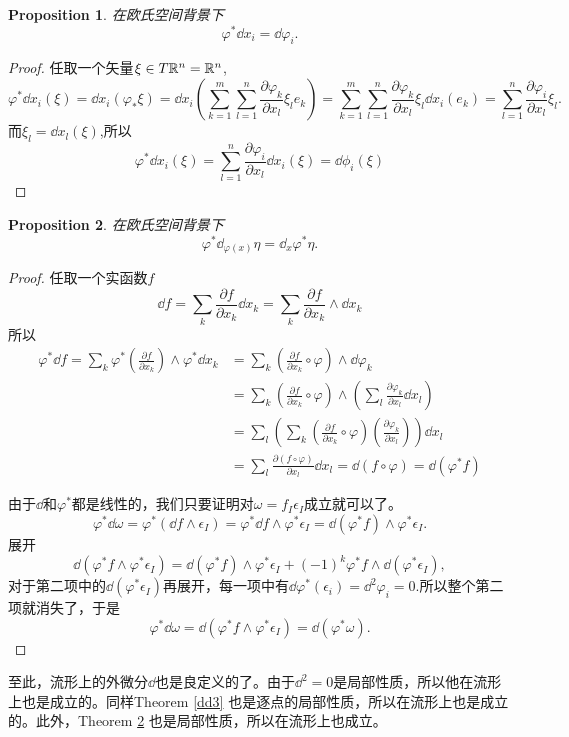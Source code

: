 \documentclass[11pt]{extbook}
\theoremstyle{plain}%
\newtheorem{pro}{Proposition}[section]%
\begin{document}
\begin{pro}在欧氏空间背景下\[\varphi^*\dd x_i=\dd \varphi_i.\]
\end{pro}
\begin{proof}
任取一个矢量$\xi \in T\mathbb{R}^n=\mathbb{R}^n$,
\[
\varphi^*\dd x_i(\xi)=\dd x_i (\varphi_*\xi)=\dd x_i \left(\sum_{k=1}^m\sum_{l=1}^n\frac{\partial \varphi_k}{\partial x_l}\xi_l e_k\right)= \sum_{k=1}^m\sum_{l=1}^n\frac{\partial \varphi_k}{\partial x_l}\xi_l \dd x_i(e_k)=\sum_{l=1}^n\frac{\partial \varphi_i}{\partial x_l}\xi_l.
\]
而$\xi_l=\dd x_l(\xi)$,所以
\[
\varphi^*\dd x_i(\xi)=\sum_{l=1}^n\frac{\partial \varphi_i}{\partial x_l}\dd x_i(\xi)=\dd \phi_i (\xi)
\]
\end{proof}
\begin{pro}在欧氏空间背景下\[\varphi^* \dd_{\varphi(x)} \eta=\dd _x\varphi^* \eta.\]
\label{dd4}
\end{pro}
\begin{proof}
任取一个实函数$f$
\[
\dd f =\sum_k \frac{\partial f}{\partial x_k}\dd x_k=\sum_k \frac{\partial f}{\partial x_k}\wedge\dd x_k
\]
所以
\[
\begin{split}
\varphi^* \dd f =\sum_k \varphi^*\left(\frac{\partial f}{\partial x_k}\right)\wedge\varphi^*\dd x_k&=\sum_k\left(\frac{\partial f}{\partial x_k}\circ \varphi\right)\wedge \dd \varphi_k\\
&=\sum_k\left(\frac{\partial f}{\partial x_k}\circ \varphi\right)\wedge \left( \sum_l\frac{\partial\varphi_k}{\partial x_l} \dd x_l\right)\\
&=\sum_{l}\left(\sum_k\left(\frac{\partial f}{\partial x_k}\circ \varphi\right) \left(\frac{\partial\varphi_k}{\partial x_l} \right)\right)\dd x_l\\
&=\sum_{l}\frac{\partial (f\circ \varphi)}{\partial x_l}\dd x_l=\dd(f\circ \varphi)=\dd(\varphi^*f)
\end{split}
\]

由于$\dd$和$\varphi^*$都是线性的，我们只要证明对$\omega=f_I\epsilon_I$成立就可以了。
\[
\varphi^*\dd \omega=\varphi^*(\dd f \wedge \epsilon_I)=\varphi^*\dd f \wedge \varphi^*\epsilon_I=\dd(\varphi^* f) \wedge \varphi^*\epsilon_I.
\]
展开
\[
\dd(\varphi^* f \wedge \varphi^*\epsilon_I)=\dd(\varphi^* f) \wedge \varphi^*\epsilon_I+(-1)^k\varphi^* f \wedge \dd(\varphi^*\epsilon_I),
\]
对于第二项中的$\dd(\varphi^*\epsilon_I)$再展开，每一项中有$\dd\varphi^*(\epsilon_i)=\dd^2\varphi_i=0$.所以整个第二项就消失了，于是
\[
\varphi^*\dd \omega=\dd(\varphi^* f \wedge \varphi^*\epsilon_I)=\dd (\varphi^* \omega).
\]
\end{proof}
至此，流形上的外微分$\dd$也是良定义的了。由于$\dd^2=0$是局部性质，所以他在流形上也是成立的。同样Theorem \ref{dd3} 也是逐点的局部性质，所以在流形上也是成立的。此外，Theorem \ref{dd4} 也是局部性质，所以在流形上也成立。
\end{document}
